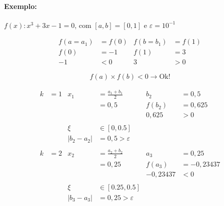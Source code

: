 \documentclass{article}
\begin{document}
        \paragraph{Exemplo:} $f(x) : x^3 + 3x - 1= 0$, com $[a,b] = [0,1]$ e $\varepsilon = 10^{-1}$

        \begin{align*}
            f(a = a_1) &= f(0)  &   f(b = b_1) &= f(1)\\
            f(0) &= -1          &   f(1) &= 3\\
            -1 &< 0             &   3 &> 0
        \end{align*}

        \[f(a) \times f(b) < 0 \rightarrow \text{Ok!}\]

        \begin{align*}
            k &= 1          &           x_1 &= \frac{a_1 + b_1}{2}      &       b_2 &= 0,5\\
            &               &           &= 0,5                          &       f(b_2) &= 0,625\\
            &               &           &                               &       0,625 &> 0\\
            \\
            &               &           \xi &\in [0,0.5]\\
            &               &           |b_2 - a_2| &= 0,5 > \varepsilon\\
            \\
            k &= 2          &           x_2 &= \frac{a_2 + b_2}{2}      &       a_3 &= 0,25\\
            &               &           &= 0,25                         &       f(a_3) &= -0,23437\\
            &               &           &                               &       -0,23437 &< 0\\
            \\
            &               &           \xi &\in [0.25,0.5]\\
            &               &           |b_3 - a_3| &= 0,25 > \varepsilon
        \end{align*}
\end{document}
